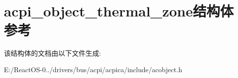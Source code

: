 \hypertarget{structacpi__object__thermal__zone}{}\section{acpi\+\_\+object\+\_\+thermal\+\_\+zone结构体 参考}
\label{structacpi__object__thermal__zone}


该结构体的文档由以下文件生成\+:\begin{DoxyCompactItemize}
\item 
E\+:/\+React\+O\+S-\/0../drivers/bus/acpi/acpica/include/acobject.\+h\end{DoxyCompactItemize}
